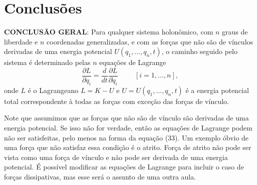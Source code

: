 \documentclass{article}
\begin{document}
\section{Conclusões} 

\noindent \textbf{CONCLUSÃO GERAL}: Para qualquer sistema holonômico, com $n$ graus de liberdade e $n$ coordenadas generalizadas, e com as forças que não são de vínculos derivadas de uma energia potencial $U(q_1,...,q_n,t)$, o caminho seguido pelo sistema é determinado pelas $n$ equações de Lagrange
\begin{equation}
    \frac{\partial L}{\partial q_i} = \frac{d}{dt}\frac{\partial L}{\partial \dot{q}_i} \hspace{1cm} [i=1,...,n],
\end{equation}
onde $L$ é o Lagrangeano $L = K - U$ e $U = U(q_1,...,q_n,t)$ é a energia potencial total correspondente à todas as forças com exceção das forças de vínculo. 

Note que assumimos que as forças que não são de vínculo são derivadas de uma energia potencial. Se isso não for verdade, então as equações de Lagrange podem não ser satisfeitas, pelo menos na forma da equação (33). Um exemplo óbvio de uma força que não satisfaz essa condição é o atrito. Força de atrito não pode ser vista como uma força de vínculo e não pode ser derivada de uma energia potencial. É possível modificar as equações de Lagrange para incluir o caso de forças dissipativas, mas esse será o assunto de uma outra aula.
\end{document}
